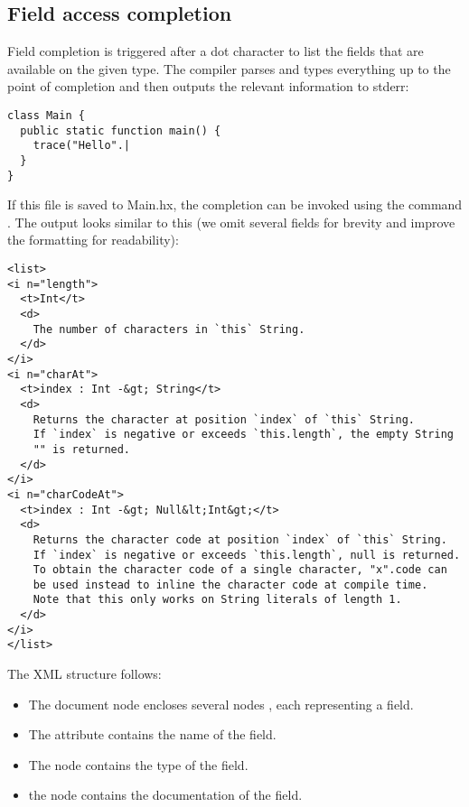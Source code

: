 \subsection{Field access completion}
\label{cr-completion-field-access}

Field completion is triggered after a dot  character to list the fields that are available on the given type. The compiler parses and types everything up to the point of completion and then outputs the relevant information to stderr:

\begin{lstlisting}
class Main {
  public static function main() {
    trace("Hello".|
  }
}
\end{lstlisting}

If this file is saved to Main.hx, the completion can be invoked using the command . The output looks similar to this (we omit several fields for brevity and improve the formatting for readability):

\begin{lstlisting}
<list>
<i n="length">
  <t>Int</t>
  <d>
    The number of characters in `this` String.
  </d>
</i>
<i n="charAt">
  <t>index : Int -&gt; String</t>
  <d>
    Returns the character at position `index` of `this` String.
    If `index` is negative or exceeds `this.length`, the empty String
    "" is returned.
  </d>
</i>
<i n="charCodeAt">
  <t>index : Int -&gt; Null&lt;Int&gt;</t>
  <d>
    Returns the character code at position `index` of `this` String.
    If `index` is negative or exceeds `this.length`, null is returned.
    To obtain the character code of a single character, "x".code can
    be used instead to inline the character code at compile time.
    Note that this only works on String literals of length 1.
  </d>
</i>
</list>
\end{lstlisting}

The XML structure follows:

\begin{itemize}
	\item The document node  encloses several nodes , each representing a field.
	\item The  attribute contains the name of the field.
	\item The  node contains the type of the field.
	\item the  node contains the documentation of the field.
\end{itemize}

